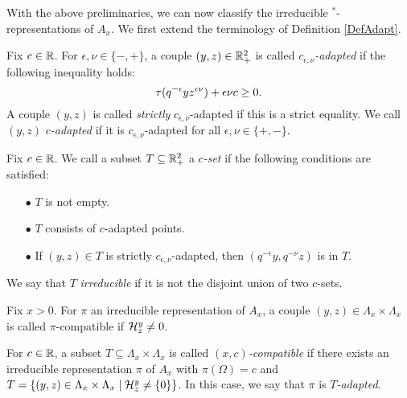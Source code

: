 With the above preliminaries, we can now classify the irreducible $^*$-representations of $A_x$. We first extend the terminology of Definition \ref{DefAdapt}.


\begin{Def} Fix $c\in \mathbb{R}$. For $\epsilon,\nu\in \{-,+\}$, a couple $(y,z)\in \mathbb{R}_+^2$ is called \emph{$c_{\epsilon,\nu}$-adapted} if the following inequality holds: \begin{equation}\label{EqAd} \operatorname{\tau}(q^{-\epsilon}yz^{\epsilon\nu})+\epsilon\nu c\geq 0.\end{equation} A couple $(y,z)$ is called \emph{strictly} $c_{\epsilon,\nu}$-adapted if this is a strict equality. We call $(y,z)$ \emph{$c$-adapted} if it is $c_{\epsilon,\nu}$-adapted for all $\epsilon,\nu\in \{+,-\}$. 
\end{Def} 

\begin{Def} Fix $c\in \mathbb{R}$. We call a subset $T\subseteq \mathbb{R}_+^2$ a \emph{$c$-set} if the following conditions are satisfied: 
\begin{itemize} 
\item[$\bullet$] $T$ is not empty.
\item[$\bullet$] $T$ consists of $c$-adapted points.
\item[$\bullet$] If $(y,z)\in T$ is strictly $c_{\epsilon,\nu}$-adapted, then $(q^{-\epsilon}y,q^{-\nu}z)$ is in $T$.
\end{itemize}

We say that $T$ \emph{irreducible} if it is not the disjoint union of two $c$-sets.

\end{Def}

\begin{Def} Fix $x>0$. For $\pi$ an irreducible representation of $A_x$, a couple $(y,z)\in \Lambda_x\times \Lambda_x$ is called $\pi$-compatible if $\mathcal{H}^y_z\neq 0$. 

For $c\in \mathbb{R}$, a subset $T\subseteq \Lambda_x\times \Lambda_x$ is called \emph{$(x,c)$-compatible} if there exists an irreducible representation $\pi$ of $A_x$ with $\pi(\Omega) = c$ and $T=\{(y,z)\in \Lambda_x\times \Lambda_x\mid \mathcal{H}^{y}_{z}\neq \{0\}\}$. In this case, we say that $\pi$ is \emph{$T$-adapted}.
\end{Def}

